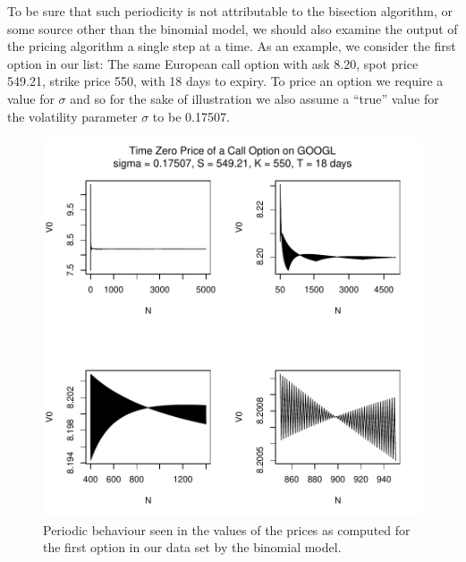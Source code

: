 \documentclass[12pt]{article}
\newlength\tindent
\renewcommand{\indent}{\hspace*{\tindent}}
\begin{document}
\indent To be sure that such periodicity is not attributable to the bisection algorithm, or some source other than the binomial model, we should also examine the output of the pricing algorithm a single step at a time. As an example, we consider the first option in our list: The same European call option with ask 8.20, spot price 549.21, strike price 550, with 18 days to expiry. To price an option we require a value for $\sigma$ and so for the sake of illustration we also assume a ``true'' value for the volatility parameter $\sigma$ to be 0.17507.


\begin{figure}[H]
	\centering
 	\includegraphics[scale=0.75]{../plots/price_conv.pdf}
\caption{\footnotesize Periodic behaviour seen in the values of the prices as computed for the first option in our data set by the binomial model.}
\end{figure}
\end{document}
